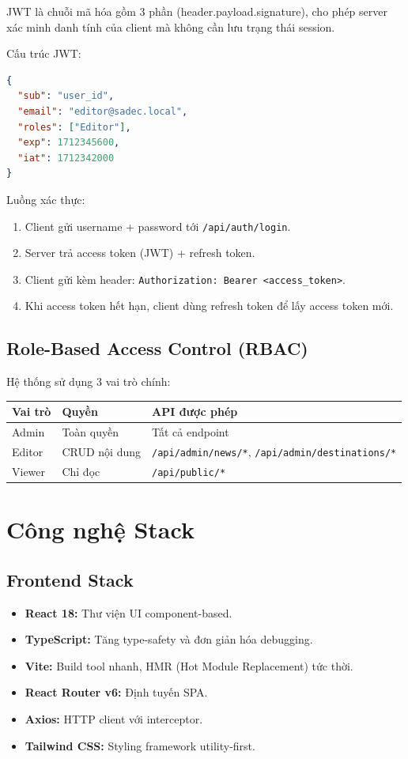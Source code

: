 \documentclass[12pt,a4paper,oneside]{report}
\begin{document}
JWT là chuỗi mã hóa gồm 3 phần (header.payload.signature), cho phép server xác minh danh tính của client mà không cần lưu trạng thái session.

Cấu trúc JWT:
\begin{lstlisting}[language=json,caption={Ví dụ JWT Payload}]
{
  "sub": "user_id",
  "email": "editor@sadec.local",
  "roles": ["Editor"],
  "exp": 1712345600,
  "iat": 1712342000
}
\end{lstlisting}

Luồng xác thực:
\begin{enumerate}[itemsep=2pt]
  \item Client gửi username + password tới \texttt{/api/auth/login}.
  \item Server trả access token (JWT) + refresh token.
  \item Client gửi kèm header: \texttt{Authorization: Bearer <access\_token>}.
  \item Khi access token hết hạn, client dùng refresh token để lấy access token mới.
\end{enumerate}

\subsection{Role-Based Access Control (RBAC)}

Hệ thống sử dụng 3 vai trò chính:

\begin{center}
\begin{tabular}{|l|p{4cm}|p{4.5cm}|}
\hline
\textbf{Vai trò} & \textbf{Quyền} & \textbf{API được phép} \\
\hline
Admin & Toàn quyền & Tất cả endpoint \\
\hline
Editor & CRUD nội dung & \texttt{/api/admin/news/*}, \texttt{/api/admin/destinations/*} \\
\hline
Viewer & Chỉ đọc & \texttt{/api/public/*} \\
\hline
\end{tabular}
\end{center}

\section{Công nghệ Stack}

\subsection{Frontend Stack}
\begin{itemize}[itemsep=2pt]
  \item \textbf{React 18:} Thư viện UI component-based.
  \item \textbf{TypeScript:} Tăng type-safety và đơn giản hóa debugging.
  \item \textbf{Vite:} Build tool nhanh, HMR (Hot Module Replacement) tức thời.
  \item \textbf{React Router v6:} Định tuyến SPA.
  \item \textbf{Axios:} HTTP client với interceptor.
  \item \textbf{Tailwind CSS:} Styling framework utility-first.
\end{itemize}
\end{document}
